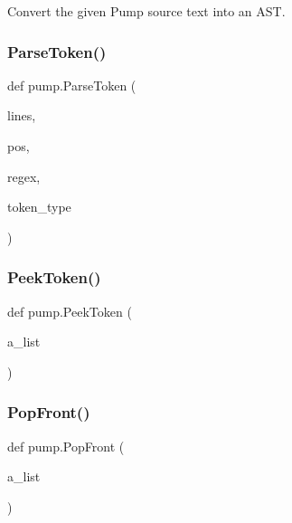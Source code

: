 \begin{DoxyVerb}Convert the given Pump source text into an AST.\end{DoxyVerb}
 \mbox{\label{namespacepump_a23761d99dd43d642e94d845218573035}} 
\subsubsection{\texorpdfstring{ParseToken()}{ParseToken()}}
{\footnotesize\ttfamily def pump.\+Parse\+Token (\begin{DoxyParamCaption}\item[{}]{lines,  }\item[{}]{pos,  }\item[{}]{regex,  }\item[{}]{token\+\_\+type }\end{DoxyParamCaption})}

\mbox{\label{namespacepump_ab12085e099ab4bd0cd968efdc435ec31}} 
\subsubsection{\texorpdfstring{PeekToken()}{PeekToken()}}
{\footnotesize\ttfamily def pump.\+Peek\+Token (\begin{DoxyParamCaption}\item[{}]{a\+\_\+list }\end{DoxyParamCaption})}

\mbox{\label{namespacepump_a8e2ff118da88397e88ccf68ebcd2df79}} 
\subsubsection{\texorpdfstring{PopFront()}{PopFront()}}
{\footnotesize\ttfamily def pump.\+Pop\+Front (\begin{DoxyParamCaption}\item[{}]{a\+\_\+list }\end{DoxyParamCaption})}

\mbox{\label{namespacepump_a45e1d5d5c1c188fc53eee8bd1e00e6b0}} 
